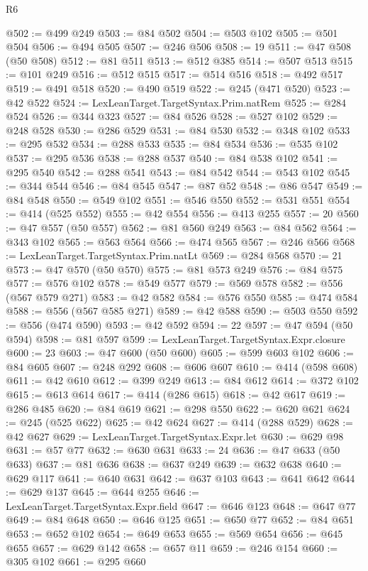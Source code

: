 \begin{lexlean}{R6}
\begin{coremodule}
@502 := @499 @249
@503 := @84 @502
@504 := @503 @102
@505 := @501 @504
@506 := @494 @505
@507 := @246 @506
@508 := 19
@511 := @47 @508 (@50 @508)
@512 := @81 @511
@513 := @512 @385
@514 := @507 @513
@515 := @101 @249
@516 := @512 @515
@517 := @514 @516
@518 := @492 @517
@519 := @491 @518
@520 := @490 @519
@522 := @245 (@471 @520)
@523 := @42 @522
@524 := LexLeanTarget.TargetSyntax.Prim.natRem
@525 := @284 @524
@526 := @344 @323
@527 := @84 @526
@528 := @527 @102
@529 := @248 @528
@530 := @286 @529
@531 := @84 @530
@532 := @348 @102
@533 := @295 @532
@534 := @288 @533
@535 := @84 @534
@536 := @535 @102
@537 := @295 @536
@538 := @288 @537
@540 := @84 @538 @102
@541 := @295 @540
@542 := @288 @541
@543 := @84 @542
@544 := @543 @102
@545 := @344 @544
@546 := @84 @545
@547 := @87 @52
@548 := @86 @547
@549 := @84 @548
@550 := @549 @102
@551 := @546 @550
@552 := @531 @551
@554 := @414 (@525 @552)
@555 := @42 @554
@556 := @413 @255
@557 := 20
@560 := @47 @557 (@50 @557)
@562 := @81 @560 @249
@563 := @84 @562
@564 := @343 @102
@565 := @563 @564
@566 := @474 @565
@567 := @246 @566
@568 := LexLeanTarget.TargetSyntax.Prim.natLt
@569 := @284 @568
@570 := 21
@573 := @47 @570 (@50 @570)
@575 := @81 @573 @249
@576 := @84 @575
@577 := @576 @102
@578 := @549 @577
@579 := @569 @578
@582 := @556 (@567 @579 @271)
@583 := @42 @582
@584 := @576 @550
@585 := @474 @584
@588 := @556 (@567 @585 @271)
@589 := @42 @588
@590 := @503 @550
@592 := @556 (@474 @590)
@593 := @42 @592
@594 := 22
@597 := @47 @594 (@50 @594)
@598 := @81 @597
@599 := LexLeanTarget.TargetSyntax.Expr.closure
@600 := 23
@603 := @47 @600 (@50 @600)
@605 := @599 @603 @102
@606 := @84 @605
@607 := @248 @292
@608 := @606 @607
@610 := @414 (@598 @608)
@611 := @42 @610
@612 := @399 @249
@613 := @84 @612
@614 := @372 @102
@615 := @613 @614
@617 := @414 (@286 @615)
@618 := @42 @617
@619 := @286 @485
@620 := @84 @619
@621 := @298 @550
@622 := @620 @621
@624 := @245 (@525 @622)
@625 := @42 @624
@627 := @414 (@288 @529)
@628 := @42 @627
@629 := LexLeanTarget.TargetSyntax.Expr.let
@630 := @629 @98
@631 := @57 @77
@632 := @630 @631
@633 := 24
@636 := @47 @633 (@50 @633)
@637 := @81 @636
@638 := @637 @249
@639 := @632 @638
@640 := @629 @117
@641 := @640 @631
@642 := @637 @103
@643 := @641 @642
@644 := @629 @137
@645 := @644 @255
@646 := LexLeanTarget.TargetSyntax.Expr.field
@647 := @646 @123
@648 := @647 @77
@649 := @84 @648
@650 := @646 @125
@651 := @650 @77
@652 := @84 @651
@653 := @652 @102
@654 := @649 @653
@655 := @569 @654
@656 := @645 @655
@657 := @629 @142
@658 := @657 @11
@659 := @246 @154
@660 := @305 @102
@661 := @295 @660

\end{coremodule}
\end{lexlean}
